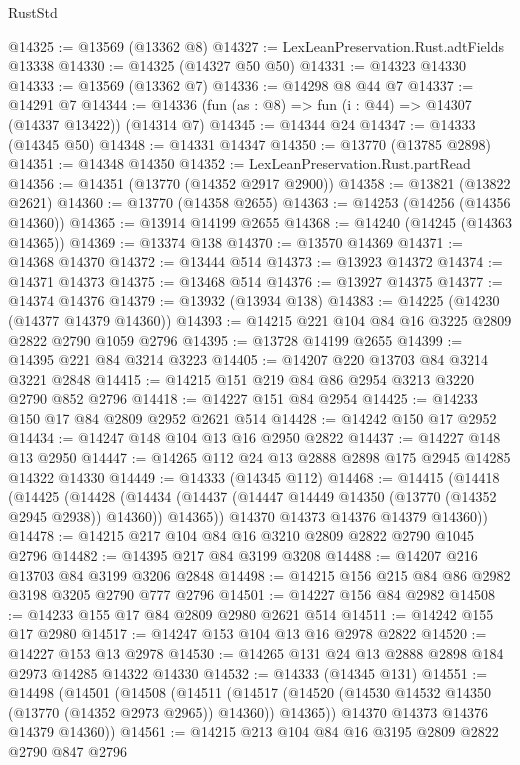 \begin{lexlean}{RustStd}
\begin{coremodule}
@14325 := @13569 (@13362 @8)
@14327 := LexLeanPreservation.Rust.adtFields @13338
@14330 := @14325 (@14327 @50 @50)
@14331 := @14323 @14330
@14333 := @13569 (@13362 @7)
@14336 := @14298 @8 @44 @7
@14337 := @14291 @7
@14344 := @14336 (fun (as : @8) => fun (i : @44) => @14307 (@14337 @13422)) (@14314 @7)
@14345 := @14344 @24
@14347 := @14333 (@14345 @50)
@14348 := @14331 @14347
@14350 := @13770 (@13785 @2898)
@14351 := @14348 @14350
@14352 := LexLeanPreservation.Rust.partRead
@14356 := @14351 (@13770 (@14352 @2917 @2900))
@14358 := @13821 (@13822 @2621)
@14360 := @13770 (@14358 @2655)
@14363 := @14253 (@14256 (@14356 @14360))
@14365 := @13914 @14199 @2655
@14368 := @14240 (@14245 (@14363 @14365))
@14369 := @13374 @138
@14370 := @13570 @14369
@14371 := @14368 @14370
@14372 := @13444 @514
@14373 := @13923 @14372
@14374 := @14371 @14373
@14375 := @13468 @514
@14376 := @13927 @14375
@14377 := @14374 @14376
@14379 := @13932 (@13934 @138)
@14383 := @14225 (@14230 (@14377 @14379 @14360))
@14393 := @14215 @221 @104 @84 @16 @3225 @2809 @2822 @2790 @1059 @2796
@14395 := @13728 @14199 @2655
@14399 := @14395 @221 @84 @3214 @3223
@14405 := @14207 @220 @13703 @84 @3214 @3221 @2848
@14415 := @14215 @151 @219 @84 @86 @2954 @3213 @3220 @2790 @852 @2796
@14418 := @14227 @151 @84 @2954
@14425 := @14233 @150 @17 @84 @2809 @2952 @2621 @514
@14428 := @14242 @150 @17 @2952
@14434 := @14247 @148 @104 @13 @16 @2950 @2822
@14437 := @14227 @148 @13 @2950
@14447 := @14265 @112 @24 @13 @2888 @2898 @175 @2945 @14285 @14322 @14330
@14449 := @14333 (@14345 @112)
@14468 := @14415
    (@14418
      (@14425
        (@14428
          (@14434 (@14437 (@14447 @14449 @14350 (@13770 (@14352 @2945 @2938)) @14360)) @14365))
        @14370
        @14373
        @14376
        @14379
        @14360))
@14478 := @14215 @217 @104 @84 @16 @3210 @2809 @2822 @2790 @1045 @2796
@14482 := @14395 @217 @84 @3199 @3208
@14488 := @14207 @216 @13703 @84 @3199 @3206 @2848
@14498 := @14215 @156 @215 @84 @86 @2982 @3198 @3205 @2790 @777 @2796
@14501 := @14227 @156 @84 @2982
@14508 := @14233 @155 @17 @84 @2809 @2980 @2621 @514
@14511 := @14242 @155 @17 @2980
@14517 := @14247 @153 @104 @13 @16 @2978 @2822
@14520 := @14227 @153 @13 @2978
@14530 := @14265 @131 @24 @13 @2888 @2898 @184 @2973 @14285 @14322 @14330
@14532 := @14333 (@14345 @131)
@14551 := @14498
    (@14501
      (@14508
        (@14511
          (@14517 (@14520 (@14530 @14532 @14350 (@13770 (@14352 @2973 @2965)) @14360)) @14365))
        @14370
        @14373
        @14376
        @14379
        @14360))
@14561 := @14215 @213 @104 @84 @16 @3195 @2809 @2822 @2790 @847 @2796

\end{coremodule}
\end{lexlean}
